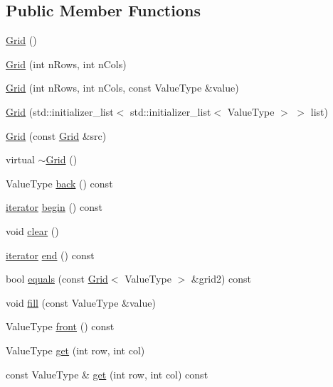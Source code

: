 \subsection*{Public Member Functions}
\begin{DoxyCompactItemize}
\item 
\mbox{\hyperlink{classGrid_a0a335d0339fe70071fcdf4cd5b1c7b5f}{Grid}} ()
\item 
\mbox{\hyperlink{classGrid_a2b85c90f2410379e8a679e3a791ace5f}{Grid}} (int n\+Rows, int n\+Cols)
\item 
\mbox{\hyperlink{classGrid_a761417d65311775962eee45e3996c3fc}{Grid}} (int n\+Rows, int n\+Cols, const Value\+Type \&value)
\item 
\mbox{\hyperlink{classGrid_a02f3843d47cb91f569bcd8177c99ae92}{Grid}} (std\+::initializer\+\_\+list$<$ std\+::initializer\+\_\+list$<$ Value\+Type $>$ $>$ list)
\item 
\mbox{\hyperlink{classGrid_aa5d57d67f0fd6f1565a863a794122a35}{Grid}} (const \mbox{\hyperlink{classGrid}{Grid}} \&src)
\item 
virtual \mbox{\hyperlink{classGrid_a16d42516a2abe71deb47c2f4b2796074}{$\sim$\+Grid}} ()
\item 
Value\+Type \mbox{\hyperlink{classGrid_a38cbd80c93f450dc9bf3ca7c6a6220bd}{back}} () const
\item 
\mbox{\hyperlink{classGrid_1_1iterator}{iterator}} \mbox{\hyperlink{classGrid_a0c62c15c8ed609e7e5e9518cf5f5c712}{begin}} () const
\item 
void \mbox{\hyperlink{classGrid_ac8bb3912a3ce86b15842e79d0b421204}{clear}} ()
\item 
\mbox{\hyperlink{classGrid_1_1iterator}{iterator}} \mbox{\hyperlink{classGrid_a68b688a51bd0cf6fb5bc2cba292209a8}{end}} () const
\item 
bool \mbox{\hyperlink{classGrid_a9619d603ca957ce2be5b13198af5ee02}{equals}} (const \mbox{\hyperlink{classGrid}{Grid}}$<$ Value\+Type $>$ \&grid2) const
\item 
void \mbox{\hyperlink{classGrid_ac8f8ff1a5d0997596cbedbc2162e4649}{fill}} (const Value\+Type \&value)
\item 
Value\+Type \mbox{\hyperlink{classGrid_abaa174a9d74f7e7e38d4944fa43b5a33}{front}} () const
\item 
Value\+Type \mbox{\hyperlink{classGrid_a49fcb88bae29483f4cb0858f29f6384e}{get}} (int row, int col)
\item 
const Value\+Type \& \mbox{\hyperlink{classGrid_a2b88a9c3e739296050588ad389667146}{get}} (int row, int col) const

\end{DoxyCompactItemize}
